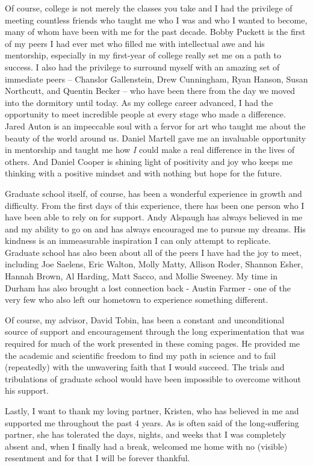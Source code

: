 \documentclass[PhD]{dukethesis2006}
\begin{document}
\begin{doublespace}
Of course, college is not merely the classes you take and I had the privilege of meeting countless friends who taught me who I was and who I wanted to become, many of whom have been with me for the past decade. Bobby Puckett is the first of my peers I had ever met who filled me with intellectual awe and his mentorship, especially in my first-year of college really set me on a path to success. I also had the privilege to surround myself with an amazing set of immediate peers -- Chanslor Gallenstein, Drew Cunningham, Ryan Hanson, Susan Northcutt, and Quentin Becker -- who have been there from the day we moved into the dormitory until today. As my college career advanced, I had the opportunity to meet incredible people at every stage who made a difference. Jared Auton is an impeccable soul with a fervor for art who taught me about the beauty of the world around us. Daniel Martell gave me an invaluable opportunity in mentorship and taught me how \textit{I} could make a real difference in the lives of others. And Daniel Cooper is shining light of positivity and joy who keeps me thinking with a positive mindset and with nothing but hope for the future.

Graduate school itself, of course, has been a wonderful experience in growth and difficulty. From the first days of this experience, there has been one person who I have been able to rely on for support. Andy Alspaugh has always believed in me and my ability to go on and has always encouraged me to pursue my dreams. His kindness is an immeasurable inspiration I can only attempt to replicate. Graduate school has also been about all of the peers I have had the joy to meet, including Joe Saelens, Eric Walton, Molly Matty, Allison Roder, Shannon Esher, Hannah Brown, Al Harding, Matt Sacco, and Mollie Sweeney. My time in Durham has also brought a lost connection back - Austin Farmer - one of the very few who also left our hometown to experience something different. 

Of course, my advisor, David Tobin, has been a constant and unconditional source of support and encouragement through the long experimentation that was required for much of the work presented in these coming pages. He provided me the academic and scientific freedom to find my path in science and to fail (repeatedly) with the unwavering faith that I would succeed. The trials and tribulations of graduate school would have been impossible to overcome without his support.

Lastly, I want to thank my loving partner, Kristen, who has believed in me and supported me throughout the past 4 years. As is often said of the long-suffering partner, she has tolerated the days, nights, and weeks that I was completely absent and, when I finally had a break, welcomed me home with no (visible) resentment and for that I will be forever thankful.

\end{doublespace}
\end{document}
